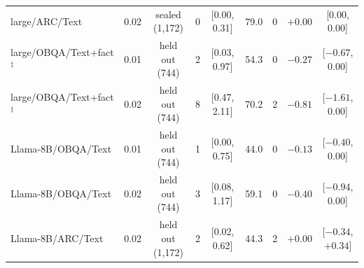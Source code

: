 \begin{table}[!htbp]
\begin{tabular*}{\linewidth}{@{}l@{\hspace{4pt}\extracolsep{\fill}}cccccccc@{}}
\addlinespace[2pt]
large/ARC/Text & 0.02 & sealed (1,172) & 0 & [0.00, 0.31] & 79.0 & 0 & $+0.00$ & [0.00, 0.00]\\
\addlinespace[2pt]
large/OBQA/Text+fact$^\ddagger$ & 0.01 & held out (744) & 2 & [0.03, 0.97] & 54.3 & 0 & $-0.27$ & [$-0.67$, 0.00]\\
large/OBQA/Text+fact$^\ddagger$ & 0.02 & held out (744) & 8 & [0.47, 2.11] & 70.2 & 2 & $-0.81$ & [$-1.61$, 0.00]\\
\addlinespace[2pt]
Llama-8B/OBQA/Text & 0.01 & held out (744) & 1 & [0.00, 0.75] & 44.0 & 0 & $-0.13$ & [$-0.40$, 0.00]\\
Llama-8B/OBQA/Text & 0.02 & held out (744) & 3 & [0.08, 1.17] & 59.1 & 0 & $-0.40$ & [$-0.94$, 0.00]\\
\addlinespace[2pt]
Llama-8B/ARC/Text & 0.02 & held out (1,172) & 2 & [0.02, 0.62] & 44.3 & 2 & $+0.00$ & [$-0.34$, $+0.34$]\\\bottomrule
\end{tabular*}
\end{table}

